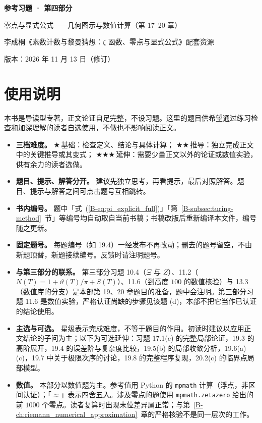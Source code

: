 \documentclass[11pt,a4paper]{article}
\newcommand{\bref}[1]{\ref*{B-#1}}
\newcommand{\lvI}{$\bigstar$\,基础}
\newcommand{\lvII}{$\bigstar\bigstar$\,推导}
\newcommand{\lvIII}{$\bigstar\bigstar\bigstar$\,延伸}
\newcommand{\versiondate}{2026 年 11 月 13 日（修订）}
\begin{document}
\begin{center}
{\LARGE\bfseries 参考习题 · 第四部分\par}
\vspace{0.6em}
{\large 零点与显式公式——几何图示与数值计算（第 17–20 章）\par}
\vspace{0.6em}
{\normalsize 李成桐《素数计数与黎曼猜想：$\zeta$ 函数、零点与显式公式》配套资源\par}
\vspace{0.3em}
{\small 版本：\versiondate\par}
\end{center}

\vspace{0.8em}
\section*{使用说明}

本书是导读型专著，正文论证自足完整，不设习题。这里的题目供希望通过练习检查和加深理解的读者自选使用，不做也不影响阅读正文。

\begin{itemize}
  \item \textbf{三档难度。}
    \lvI：检查定义、结论与具体计算；
    \lvII：独立完成正文中的关键推导或其变式；
    \lvIII：需要少量正文以外的论证或数值实验，供有余力的读者选做。
  \item \textbf{题目、提示、解答分开。}
    建议先独立思考，再看提示，最后对照解答。题目、提示与解答之间可点击题号互相跳转。
  \item \textbf{书内编号。}
    题中「式~(\bref{eq:pi_explicit_full})」「第~\bref{subsec:turing-method}~节」等编号均自动取自当前书稿；书稿改版后重新编译本文件，编号随之更新。
  \item \textbf{固定题号。}
    每题编号（如 19.4）一经发布不再改动；删去的题号留空，不由新题顶替，新题接续编号。反馈时请注明题号。
  \item \textbf{与第三部分的联系。}
    第三部分习题 10.4（$\Xi$ 与 $Z$）、11.2（$N(T)=1+\vartheta(T)/\pi+S(T)$）、11.6（到高度 $100$ 的数值核验）与 13.3（数值库的分支）是本部第 19、20 章题目的准备，题中会注明。第三部分习题 11.6 是数值实验，严格认证尚缺的步骤见该题 (d)，本部不把它当作已认证的结论使用。
  \item \textbf{主选与可选。}
    星级表示完成难度，不等于题目的作用。初读时建议以应用正文结论的子问为主；以下为可选延伸：习题 17.1(c) 的完整局部论证，19.3 的高阶展开，19.4 的误差阶与复杂度比较，19.5(b) 的局部收敛分析，19.6(a)(c)，19.7 中关于极限次序的讨论，19.8 的完整程序复现，20.2(c) 的临界点局部模型。
  \item \textbf{数值。}
    本部分以数值题为主。参考值用 Python 的 \texttt{mpmath} 计算（浮点，非区间认证）；「$\approx$」表示四舍五入。涉及零点的题使用 \texttt{mpmath.zetazero} 给出的前 $1000$ 个零点。读者复算时出现末位差异属正常；与第~\bref{ch:riemann_numerical_approximation}~章的严格核验不是同一层次的工作。
\end{itemize}
\end{document}
